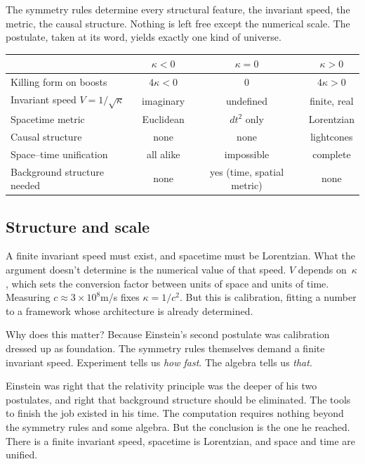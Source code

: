 \documentclass[11pt]{article}
\begin{document}
The symmetry rules determine every structural feature, the invariant speed, the metric, the causal structure. Nothing is left free except the numerical scale. The postulate, taken at its word, yields exactly one kind of universe.

\medskip

\begin{center}
\renewcommand{\arraystretch}{1.35}
\begin{tabular}{@{}lccc@{}}
\toprule
& $\kappa < 0$ & $\kappa = 0$ & $\kappa > 0$ \\
\midrule
Killing form on boosts & $4\kappa < 0$ & $0$ & $4\kappa > 0$ \\
Invariant speed $V = 1/\sqrt{\kappa}$ & imaginary & undefined & finite, real \\
Spacetime metric & Euclidean & $dt^2$ only & Lorentzian \\
Causal structure & none & none & lightcones \\
Space--time unification & all alike & impossible & complete \\
Background structure needed & none & yes (time, spatial metric) & none \\
\bottomrule
\end{tabular}
\end{center}


\subsection*{Structure and scale}

A finite invariant speed must exist, and spacetime must be Lorentzian. What the argument doesn't determine is the numerical value of that speed. $V$ depends on~$\kappa$, which sets the conversion factor between units of space and units of time. Measuring $c \approx 3 \times 10^8$\;m/s fixes $\kappa = 1/c^2$. But this is calibration, fitting a number to a framework whose architecture is already determined.

Why does this matter? Because Einstein's second postulate was calibration dressed up as foundation. The symmetry rules themselves demand a finite invariant speed. Experiment tells us \emph{how fast}. The algebra tells us \emph{that}.

Einstein was right that the relativity principle was the deeper of his two postulates, and right that background structure should be eliminated. The tools to finish the job existed in his time. The computation requires nothing beyond the symmetry rules and some algebra. But the conclusion is the one he reached. There is a finite invariant speed, spacetime is Lorentzian, and space and time are unified.
\end{document}
